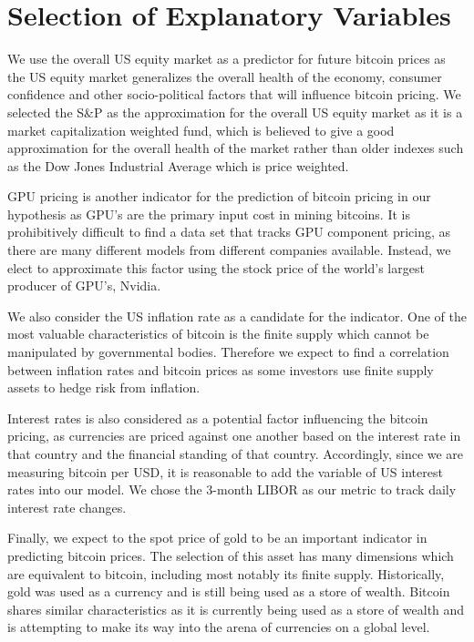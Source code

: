 \documentclass[9pt,twocolumn,twoside]{ilcss}
\begin{document}
\section{Selection of Explanatory Variables}
We use the overall US equity market as a predictor for future bitcoin prices as the US equity market generalizes the overall health of the economy, consumer confidence and other socio-political factors that will influence bitcoin pricing. We selected the S\&P as the approximation for the overall US equity market as it is a market capitalization weighted fund, which is believed to give a good approximation for the overall health of the market rather than older indexes such as the Dow Jones Industrial Average which is price weighted.  

GPU pricing is another indicator for the prediction of bitcoin pricing in our hypothesis as GPU’s are the primary input cost in mining bitcoins. It is prohibitively difficult to find a data set that tracks GPU component pricing, as there are many different models from different companies available. Instead, we elect to approximate this factor using the stock price of the world’s largest producer of GPU’s, Nvidia.

We also consider the US inflation rate as a candidate for the indicator. One of the most valuable characteristics of bitcoin is the finite supply which cannot be manipulated by governmental bodies. Therefore we expect to find a correlation between inflation rates and bitcoin prices as some investors use finite supply assets to hedge risk from inflation.

Interest rates is also considered as a potential factor influencing the bitcoin pricing, as currencies are priced against one another based on the interest rate in that country and the financial standing of that country. Accordingly, since we are measuring bitcoin per USD, it is reasonable to add the variable of US interest rates into our model. We chose the 3-month LIBOR as our metric to track daily interest rate changes.

Finally, we expect to the spot price of gold to be an important indicator in predicting bitcoin prices. The selection of this asset has many dimensions which are equivalent to bitcoin, including most notably its finite supply. Historically, gold was used as a currency and is still being used as a store of wealth. Bitcoin shares similar characteristics as it is currently being used as a store of wealth and is attempting to make its way into the arena of currencies on a global level.
\end{document}
